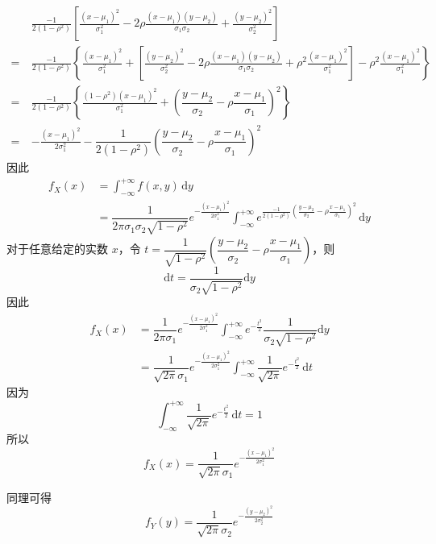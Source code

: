 \begin{myproof}
    $$
    \begin{aligned}
        & \frac{-1}{2(1-\rho^2)} \left[ \frac{(x-\mu_1)^2}{\sigma_1^2} - 2 \rho \frac{(x-\mu_1)(y-\mu_2)}{\sigma_1 \sigma_2} + \frac{(y-\mu_2)^2}{\sigma_2^2} \right] \\
        = \  & \frac{-1}{2(1-\rho^2)} \left\{ \frac{(x-\mu_1)^2}{\sigma_1^2} + \left[ \frac{(y-\mu_2)^2}{\sigma_2^2} - 2 \rho \frac{(x-\mu_1)(y-\mu_2)}{\sigma_1 \sigma_2} + \rho^2 \frac{(x-\mu_1)^2}{\sigma_1^2} \right] - \rho^2 \frac{(x-\mu_1)^2}{\sigma_1^2} \right\} \\
        = \  & \frac{-1}{2(1-\rho^2)} \left\{ \frac{(1-\rho^2)(x-\mu_1)^2}{\sigma_1^2} + \left( \dfrac{y-\mu_2}{\sigma_2} - \rho \dfrac{x-\mu_1}{\sigma_1} \right)^2 \right\} \\
        = \  & -\frac{(x-\mu_1)^2}{2\sigma_1^2} - \dfrac{1}{2(1-\rho^2)} \left( \dfrac{y-\mu_2}{\sigma_2} - \rho \dfrac{x-\mu_1}{\sigma_1} \right)^2
    \end{aligned}
    $$
    因此
    $$
    \begin{aligned}
        f_{X}(x) &= \int_{-\infty}^{+\infty} f(x,y) \, \text{d}y \\
        &= \dfrac{1}{2 \pi \sigma_1 \sigma_2 \sqrt{1-\rho^2}} e^{-\frac{(x-\mu_1)^2}{2 \sigma_1^2}} \int_{-\infty}^{+\infty} e^{\frac{-1}{2(1-\rho^2)} \left( \frac{y-\mu_2}{\sigma_2} - \rho \frac{x-\mu_1}{\sigma_1} \right)^2} \, \text{d}y
    \end{aligned}
    $$
    对于任意给定的实数 $x$，令 $t = \dfrac{1}{\sqrt{1-\rho^2}} \left( \dfrac{y-\mu_2}{\sigma_2} - \rho \dfrac{x-\mu_1}{\sigma_1} \right)$，则
    $$
    \text{d}t = \dfrac{1}{\sigma_2 \sqrt{1-\rho^2}} \text{d}y
    $$
    因此
    $$
    \begin{aligned}
        f_{X}(x) &= \dfrac{1}{2 \pi \sigma_1} e^{-\frac{(x-\mu_1)^2}{2 \sigma_1^2}} \int_{-\infty}^{+\infty} e^{-\frac{t^2}{2}} \dfrac{1}{\sigma_2 \sqrt{1-\rho^2}} \text{d}y \\
        &= \dfrac{1}{\sqrt{2\pi} \sigma_1} e^{-\frac{(x-\mu_1)^2}{2 \sigma_1^2}} \int_{-\infty}^{+\infty} \dfrac{1}{\sqrt{2\pi}} e^{-\frac{t^2}{2}} \, \text{d}t
    \end{aligned}
    $$
    因为
    $$
    \int_{-\infty}^{+\infty} \dfrac{1}{\sqrt{2\pi}} e^{-\frac{t^2}{2}} \, \text{d}t = 1
    $$
    所以
    $$
    f_{X}(x) = \dfrac{1}{\sqrt{2\pi} \sigma_1} e^{-\frac{(x-\mu_1)^2}{2 \sigma_1^2}}
    $$

    同理可得
    $$
    f_{Y}(y) = \dfrac{1}{\sqrt{2\pi} \sigma_2} e^{-\frac{(y-\mu_2)^2}{2 \sigma_2^2}}
    $$
\end{myproof}

